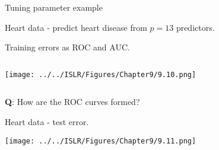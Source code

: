 \documentclass[10pt,ignorenonframetext,]{beamer}
\begin{document}
\begin{frame}

\begin{block}{Tuning parameter example}

\vspace{2mm}

Heart data - predict heart disease from \(p=13\) predictors.

Training errors as ROC and AUC.

\vspace{1mm}

\(~\) \centering

\texttt{[image: ../../ISLR/Figures/Chapter9/9.10.png]}

\(~\)

\flushleft

\textbf{Q}: How are the ROC curves formed?

\end{block}

\end{frame}

\begin{frame}

Heart data - test error.

\centering

\texttt{[image: ../../ISLR/Figures/Chapter9/9.11.png]}

\end{frame}
\end{document}
